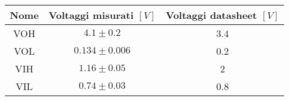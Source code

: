 \begin{tabular}{ccc}
\hline
	Nome & Voltaggi misurati $[V]$ & Voltaggi datasheet $[V]$\\ 
\hline
	VOH & $4.1\pm0.2$ & 3.4 \\
	VOL & $0.134\pm0.006$ & 0.2 \\
	VIH & $1.16\pm0.05$ & 2 \\
	VIL & $0.74\pm0.03$ & 0.8 \\
\hline
\end{tabular}
